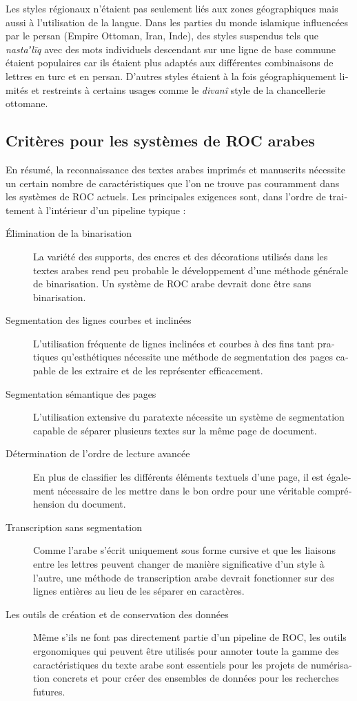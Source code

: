 \begin{french}
Les styles régionaux n'étaient pas seulement liés aux zones géographiques mais
aussi à l'utilisation de la langue.  Dans les parties du monde islamique
influencées par le persan (Empire Ottoman, Iran, Inde), des styles suspendus
tels que \emph{nastaʼlīq} avec des mots individuels descendant sur une ligne de
base commune étaient populaires car ils étaient plus adaptés aux différentes
combinaisons de lettres en turc et en persan. D'autres styles étaient à la fois
géographiquement limités et restreints à certains usages comme le
\emph{divanî} style de la chancellerie ottomane.

\subsection{Critères pour les systèmes de ROC arabes}

En résumé, la reconnaissance des textes arabes imprimés et manuscrits nécessite
un certain nombre de caractéristiques que l'on ne trouve pas couramment dans
les systèmes de ROC actuels. Les principales exigences sont, dans l'ordre de
traitement à l'intérieur d'un pipeline typique :

\begin{description}
	\item[Élimination de la binarisation] La variété des supports, des encres et des décorations utilisés
		dans les textes arabes rend peu probable le développement d'une
		méthode générale de binarisation. Un système de ROC arabe devrait
		donc être sans binarisation.
	\item[Segmentation des lignes courbes et inclinées] L'utilisation
		fréquente de lignes inclinées et courbes à des fins tant
		pratiques qu'esthétiques nécessite une méthode de segmentation
		des pages capable de les extraire et de les représenter
		efficacement.
	\item[Segmentation sémantique des pages] L'utilisation extensive du
		paratexte nécessite un système de segmentation capable de
		séparer plusieurs textes sur la même page de document.
	\item[Détermination de l'ordre de lecture avancée] En plus de
		classifier les différents éléments textuels d'une page, il est
		également nécessaire de les mettre dans le bon ordre pour une
		véritable compréhension du document.
	\item[Transcription sans segmentation] Comme l'arabe s'écrit uniquement
		sous form\-e cursive et que les liaisons entre les lettres
		peuvent changer de manière significative d'un style à l'autre,
		une méthode de transcription arabe devrait fonctionner sur des
		lignes entières au lieu de les séparer en caractères.
	\item[Les outils de création et de conservation des données]
		Même s'ils ne font pas directement partie d'un pipeline de ROC,
		les outils ergonomiques qui peuv\-ent être utilisés pour annoter
		toute la gamme des caractéristiques du texte arabe sont
		essentiels pour les projets de numérisation concrets et pour
		créer des ensembles de données pour les recherches futures.
\end{description}


\end{french}
